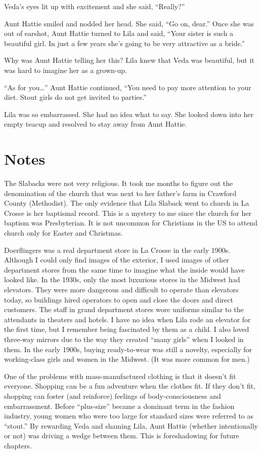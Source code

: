 \documentclass[
  american,
  letterpaper,
]{book}
\begin{document}
Veda's eyes lit up with excitement and she said, ``Really?''

Aunt Hattie smiled and nodded her head. She said, ``Go on, dear.'' Once
she was out of earshot, Aunt Hattie turned to Lila and said, ``Your
sister is such a beautiful girl. In just a few years she's going to be
very attractive as a bride.''

Why was Aunt Hattie telling her this? Lila knew that Veda was beautiful,
but it was hard to imagine her as a grown-up.

``As for you\ldots{}'' Aunt Hattie continued, ``You need to pay more
attention to your diet. Stout girls do not get invited to parties.''

Lila was so embarrassed. She had no idea what to say. She looked down
into her empty teacup and resolved to stay away from Aunt Hattie.

\section{Notes}\label{notes-12}

The Slabacks were not very religious. It took me months to figure out
the denomination of the church that was next to her father's farm in
Crawford County (Methodist). The only evidence that Lila Slaback went to
church in La Crosse is her baptismal record. This is a mystery to me
since the church for her baptism was Presbyterian. It is not uncommon
for Christians in the US to attend church only for Easter and Christmas.

Doerflingers was a real department store in La Crosse in the early
1900s. Although I could only find images of the exterior, I used images
of other department stores from the same time to imagine what the inside
would have looked like. In the 1930s, only the most luxurious stores in
the Midwest had elevators. They were more dangerous and difficult to
operate than elevators today, so buildings hired operators to open and
close the doors and direct customers. The staff in grand department
stores wore uniforms similar to the attendants in theaters and hotels. I
have no idea when Lila rode an elevator for the first time, but I
remember being fascinated by them as a child. I also loved three-way
mirrors due to the way they created ``many girls'' when I looked in
them. In the early 1900s, buying ready-to-wear was still a novelty,
especially for working-class girls and women in the Midwest. (It was
more common for men.)

One of the problems with mass-manufactured clothing is that it doesn't
fit everyone. Shopping can be a fun adventure when the clothes fit. If
they don't fit, shopping can foster (and reinforce) feelings of
body-consciousness and embarrassment. Before ``plus-size'' became a
dominant term in the fashion industry, young women who were too large
for standard sizes were referred to as ``stout.'' By rewarding Veda and
shaming Lila, Aunt Hattie (whether intentionally or not) was driving a
wedge between them. This is foreshadowing for future chapters.
\end{document}
